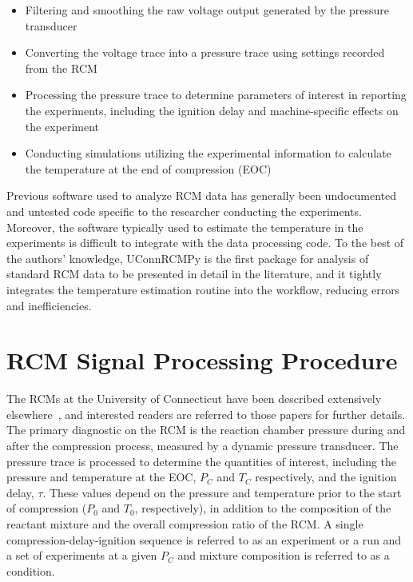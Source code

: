 \documentclass[12pt]{../ussci}
\begin{document}
\begin{itemize}
\item
  Filtering and smoothing the raw voltage output generated by the pressure
  transducer
\item
  Converting the voltage trace into a pressure trace using settings
  recorded from the RCM
\item
  Processing the pressure trace to determine parameters of interest in
  reporting the experiments, including the ignition delay and
  machine-specific effects on the experiment
\item
  Conducting simulations utilizing the experimental information to
  calculate the temperature at the end of compression (EOC)
\end{itemize}

Previous software used to analyze RCM data has generally been undocumented and
untested code specific to the researcher conducting the experiments. Moreover,
the software typically used to estimate the temperature in the experiments is
difficult to integrate with the data processing code. To the best of the
authors' knowledge, UConnRCMPy is the first package for analysis of standard RCM
data to be presented in detail in the literature, and it tightly integrates the
temperature estimation routine into the workflow, reducing errors and
inefficiencies.

\section{RCM Signal Processing Procedure}\label{rcm-signal-processing-procedure}

The RCMs at the University of Connecticut have been described extensively
elsewhere~\autocite{Das2012,Mittal2007a}, and interested readers are referred to
those papers for further details. The primary diagnostic on the RCM is the
reaction chamber pressure during and after the compression process, measured by
a dynamic pressure transducer. The pressure trace is processed to determine the
quantities of interest, including the pressure and temperature at the EOC,
\(P_C\) and \(T_C\) respectively, and the ignition delay, \(\tau\). These values
depend on the pressure and temperature prior to the start of compression
(\(P_0\) and \(T_0\), respectively), in addition to the composition of the
reactant mixture and the overall compression ratio of the RCM. A single
compression-delay-ignition sequence is referred to as an experiment or a run and
a set of experiments at a given \(P_C\) and mixture composition is referred to
as a condition.
\end{document}
